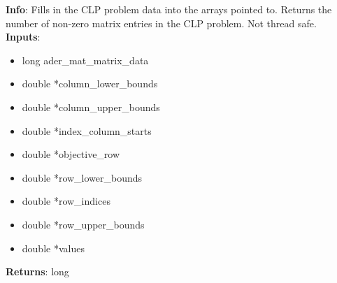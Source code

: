 \textbf{Info}: Fills in the CLP problem data into the arrays pointed to. Returns
the number of non-zero matrix entries in the CLP problem. Not thread safe. \\

\noindent \textbf{Inputs}:
\begin{itemize}
\item{long ader\_mat\_matrix\_data}
\item{double *column\_lower\_bounds}
\item{double *column\_upper\_bounds}
\item{double *index\_column\_starts}
\item{double *objective\_row}
\item{double *row\_lower\_bounds}
\item{double *row\_indices}
\item{double *row\_upper\_bounds}
\item{double *values}
\end{itemize}

\noindent \textbf{Returns}: long
